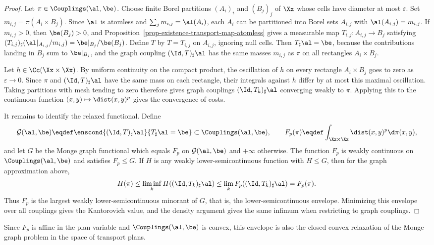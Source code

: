 \begin{proof}
	Let $\pi\in\Couplings(\al,\be)$. Choose finite Borel partitions $(A_i)_i$ and $(B_j)_j$ of $\Xx$ whose cells have diameter at most $\varepsilon$. Set $m_{i,j}=\pi(A_i\times B_j)$. Since $\al$ is atomless and $\sum_j m_{i,j}=\al(A_i)$, each $A_i$ can be partitioned into Borel sets $A_{i,j}$ with $\al(A_{i,j})=m_{i,j}$. If $m_{i,j}>0$, then $\be(B_j)>0$, and Proposition~\ref{prop-existence-transport-map-atomless} gives a measurable map
	$T_{i,j}:A_{i,j}\to B_j$ satisfying
	$(T_{i,j})_\sharp(\al|_{A_{i,j}}/m_{i,j})=\be|_{B_j}/\be(B_j)$.
	Define $T$ by $T=T_{i,j}$ on $A_{i,j}$, ignoring null cells. Then $T_\sharp\al=\be$, because the contributions landing in $B_j$ sum to $\be|_{B_j}$, and the graph coupling $(\Id,T)_\sharp\al$ has the same masses $m_{i,j}$ as $\pi$ on all rectangles $A_i\times B_j$.

	Let $h\in\Cc(\Xx\times\Xx)$. By uniform continuity on the compact product, the oscillation of $h$ on every rectangle $A_i\times B_j$ goes to zero as $\varepsilon\to0$. Since $\pi$ and $(\Id,T)_\sharp\al$ have the same mass on each rectangle, their integrals against $h$ differ by at most this maximal oscillation. Taking partitions with mesh tending to zero therefore gives graph couplings $(\Id,T_k)_\sharp\al$ converging weakly to $\pi$. Applying this to the continuous function $(x,y)\mapsto\dist(x,y)^p$ gives the convergence of costs.

	It remains to identify the relaxed functional. Define
	\[
		\mathcal G(\al,\be)
		\eqdef
		\enscond{(\Id,T)_\sharp\al}{T_\sharp\al=\be}
		\subset\Couplings(\al,\be),
		\qquad
		F_p(\pi)\eqdef\int_{\Xx\times\Xx}\dist(x,y)^p\d\pi(x,y),
	\]
	and let $G$ be the Monge graph functional which equals $F_p$ on $\mathcal G(\al,\be)$ and $+\infty$ otherwise. The function $F_p$ is weakly continuous on $\Couplings(\al,\be)$ and satisfies $F_p\leq G$. If $H$ is any weakly lower-semicontinuous function with $H\leq G$, then for the graph approximation above,
	\[
		H(\pi)\leq\liminf_k H((\Id,T_k)_\sharp\al)
		\leq
		\lim_k F_p((\Id,T_k)_\sharp\al)=F_p(\pi).
	\]
	Thus $F_p$ is the largest weakly lower-semicontinuous minorant of $G$, that is, the lower-semicontinuous envelope. Minimizing this envelope over all couplings gives the Kantorovich value, and the density argument gives the same infimum when restricting to graph couplings.
\end{proof}

Since $F_p$ is affine in the plan variable and $\Couplings(\al,\be)$ is convex, this envelope is also the closed convex relaxation of the Monge graph problem in the space of transport plans.

